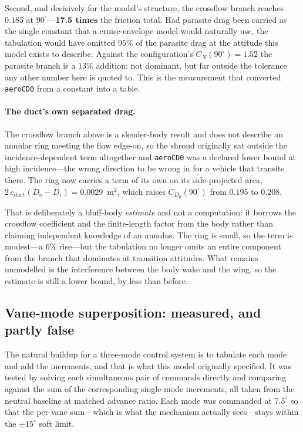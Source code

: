 \documentclass[11pt,a4paper]{article}
\newcommand{\varid}[1]{\texttt{\small #1}}
\newcommand{\dg}{^\circ}
\begin{document}
Second, and decisively for the model's structure, the crossflow branch
reaches $0.185$ at $90\dg$---\textbf{17.5 times} the friction total. Had
parasite drag been carried as the single constant that a cruise-envelope
model would naturally use, the tabulation would have omitted $95\%$ of
the parasite drag at the attitude this model exists to describe. Against
the configuration's $C_N(90\dg) = 1.52$ the parasite branch is a $13\%$
addition: not dominant, but far outside the tolerance any other number
here is quoted to. This is the measurement that converted
\varid{aeroCD0} from a constant into a table.

\paragraph{The duct's own separated drag.} The crossflow branch above is
a slender-body result and does not describe an annular ring meeting the
flow edge-on, so the shroud originally sat outside the incidence-dependent
term altogether and \varid{aeroCD0} was a declared lower bound at high
incidence---the wrong direction to be wrong in for a vehicle that
transits there. The ring now carries a term of its own on its
side-projected area, $2\,c_{\mathrm{duct}}(D_o - D_i) = 0.0029$~m$^2$,
which raises $C_{D_0}(90\dg)$ from $0.195$ to $0.208$.

That is deliberately a bluff-body \emph{estimate} and not a computation:
it borrows the crossflow coefficient and the finite-length factor from
the body rather than claiming independent knowledge of an annulus. The
ring is small, so the term is modest---a $6\%$ rise---but the tabulation
no longer omits an entire component from the branch that dominates at
transition attitudes. What remains unmodelled is the interference
between the body wake and the wing, so the estimate is still a lower
bound, by less than before.

\subsection{Vane-mode superposition: measured, and partly false}
\label{sec:superposition}

The natural buildup for a three-mode control system is to tabulate each
mode and add the increments, and that is what this model originally
specified. It was tested by solving each simultaneous pair of commands
directly and comparing against the sum of the corresponding single-mode
increments, all taken from the neutral baseline at matched advance ratio.
Each mode was commanded at $7.5\dg$ so that the per-vane sum---which is
what the mechanism actually sees---stays within the $\pm15\dg$ soft
limit.
\end{document}
